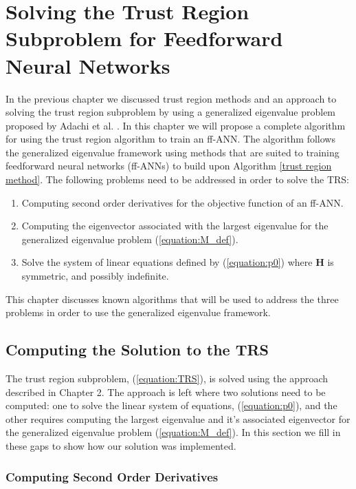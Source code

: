 \documentclass[letterpaper,12pt,titlepage,oneside,final]{book}
\begin{document}
	\chapter{Solving the Trust Region Subproblem for Feedforward Neural Networks}
	In the previous chapter we discussed trust region methods and an approach to solving the trust region subproblem by using a generalized eigenvalue problem proposed by Adachi et al. \cite{adachi.paper}. In this chapter we will propose a complete algorithm for using the trust region algorithm to train an ff-ANN. The algorithm follows the generalized eigenvalue framework using methods that are suited to training feedforward neural networks (ff-ANNs) to build upon Algorithm \ref{trust region method}. The following problems need to be addressed in order to solve the TRS:
	\begin{enumerate}
		\item Computing second order derivatives for the objective function of an ff-ANN.
		\item Computing the eigenvector associated with the largest eigenvalue for the generalized eigenvalue problem (\ref{equation:M_def}).
		\item Solve the system of linear equations defined by (\ref{equation:p0}) where $\mathbf{H}$ is symmetric, and possibly indefinite. 
	\end{enumerate}
	This chapter discusses known algorithms that will be used to address the three problems in order to use the generalized eigenvalue framework.
	
	
	\section{Computing the Solution to the TRS}
	
	The trust region subproblem, (\ref{equation:TRS}), is solved using the approach described in Chapter 2. The approach is left where two solutions need to be computed: one to solve the linear system of equations, (\ref{equation:p0}), and the other requires computing the largest eigenvalue and it's associated eigenvector for the generalized eigenvalue problem (\ref{equation:M_def}). In this section we fill in these gaps to show how our solution was implemented.
	
	\subsection{Computing Second Order Derivatives}
	
\end{document}
